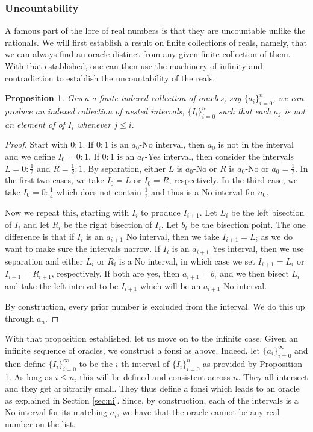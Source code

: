 \documentclass[12pt]{article}
\newtheorem{proposition}{Proposition}[subsection]
\begin{document}
\subsubsection{Uncountability}

A famous part of the lore of real numbers is that they are uncountable unlike the rationals. We will first establish a result on finite collections of reals, namely, that we can always find an oracle distinct from any given finite collection of them. With that established, one can then use the machinery of infinity and contradiction to establish the uncountability of the reals. 

\begin{proposition}\label{pr:notlist}
Given a finite indexed collection of oracles, say $\{a_i\}_{i=0}^n$, we can produce an indexed collection of nested intervals, $\{I_i\}_{i=0}^n$ such that each $a_j$ is not an element of of $I_i$ whenever $j \leq i$.
\end{proposition}

\begin{proof}
Start with $0:1$. If $0:1$ is an $a_0$-No interval, then $a_0$ is not in the interval and we define $I_0 = 0:1$. If $0:1$ is an $a_0$-Yes interval, then consider the intervals $L= 0:\tfrac{1}{2}$ and $R = \tfrac{1}{2}:1$. By separation, either $L$ is $a_0$-No or $R$ is $a_0$-No or $a_0 = \tfrac{1}{2}$. In the first two cases, we take $I_0=L$ or $I_0=R$, respectively. In the third case, we take $I_0 = 0:\tfrac{1}{4}$ which does not contain $\tfrac{1}{2}$ and thus is a No interval for $a_0$.

Now we repeat this, starting with $I_i$ to produce $I_{i+1}$. Let $L_i$ be the left bisection of $I_i$ and let $R_i$ be the right bisection of $I_i$. Let $b_i$ be the bisection point. The one difference is that if $I_i$ is an $a_{i+1}$ No interval, then we take $I_{i+1} = L_i$ as we do want to make sure the intervals narrow. If $I_i$ is an $a_{i+1}$ Yes interval, then we use separation and either $L_i$ or $R_i$ is a No interval, in which case we set $I_{i+1} = L_i $ or $I_{i+1} = R_{i+1}$, respectively. If both are yes, then $a_{i+1} = b_i$ and we then bisect $L_i$ and take the left interval to be $I_{i+1}$ which will be an $a_{i+1}$ No interval. 

By construction, every prior number is excluded from the interval. We do this up through $a_n$.
\end{proof} 

With that proposition established, let us move on to the infinite case. Given an infinite sequence of oracles, we construct a fonsi as above. Indeed, let $\{a_i\}_{i=0}^{\infty}$ and then define $\{I_i\}_{i=0}^{\infty}$ to be the $i$-th interval of $\{I_i\}_{i=0}^{n}$ as provided by Proposition \ref{pr:notlist}. As long as $i \leq n$, this will be defined and consistent across $n$. They all intersect and they get arbitrarily small. They thus define a fonsi which leads to an oracle as explained in Section \ref{sec:ni}. Since, by construction, each of the intervals is a No interval for its matching $a_i$, we have that the oracle cannot be any real number on the list. 
\end{document}
